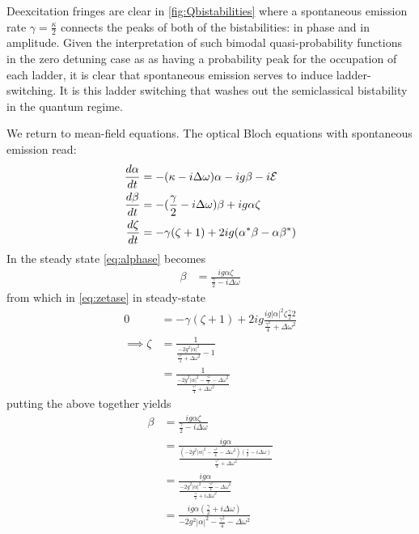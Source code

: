 Deexcitation fringes are clear in \ref{fig:Qbistabilities} where a spontaneous emission rate $ \gamma = \frac{\kappa}{2}$ connects the peaks of both of the bistabilities: in phase and in amplitude. Given the interpretation of such bimodal quasi-probability functions in the zero detuning case as as having a probability peak for the occupation of each ladder, it is clear that spontaneous emission serves to induce ladder-switching. It is this ladder switching that washes out the semiclassical bistability in the quantum regime.

We return to mean-field equations. The optical Bloch equations with spontaneous emission read:
\begin{align}
\frac{d \alpha}{dt} &= -(\kappa - i \Delta \omega)\alpha - ig \beta - i\mathcal{E}\label{eq:alphase}\\
\frac{d \beta}{dt} &= -(\frac{\gamma}{2}-i\Delta\omega)\beta+ig\alpha\zeta \label{eq:betase}\\
\frac{d\zeta}{dt} &= -\gamma (\zeta +1)+2ig(\alpha^*\beta-\alpha\beta^*) \label{eq:zetase}
\end{align}
In the steady state \cref{eq:alphase} becomes
\begin{align}
  \beta &= \frac{ig\alpha\zeta}{\frac{\gamma}{2}-i\Delta\omega}
\end{align}
from which in \cref{eq:zetase} in steady-state
\begin{align}
  0 &= -\gamma(\zeta+1)+2ig\frac{ig|\alpha|^2\zeta\frac{\gamma}{2}2}{\frac{\gamma^2}{4}+\Delta\omega^2} \\
  \implies \zeta &= \frac{1}{\frac{-2g^2|\alpha|^2}{\frac{\gamma^2}{4} +\Delta\omega^2}-1} \\
  &= \frac{1}{\frac{-2g^2|\alpha|^2 - \frac{\gamma^2}{4}-\Delta\omega^2}{\frac{\gamma^2}{4} +\Delta\omega^2}}
\end{align}
putting the above together yields
\begin{align}
  \beta &= \frac{ig\alpha\zeta}{\frac{\gamma}{2}-i\Delta\omega}\\
  &= \frac{ig\alpha}{\frac{(-2g^2|\alpha|^2-\frac{\gamma^2}{4}-\Delta\omega^2)(\frac{\gamma}{2}-i\Delta\omega)}{\frac{\gamma^2}{4}+\Delta\omega^2}}\\
  &= \frac{ig\alpha}{\frac{-2g^2|\alpha|^2-\frac{\gamma^2}{4}-\Delta\omega^2}{\frac{\gamma}{2}+i\Delta\omega^2}}\\
  &= \frac{ig\alpha(\frac{\gamma}{2}+i\Delta\omega)}{-2g^2|\alpha|^2-\frac{\gamma^2}{4}-\Delta\omega^2} \label{eq:betasolved}
\end{align}
